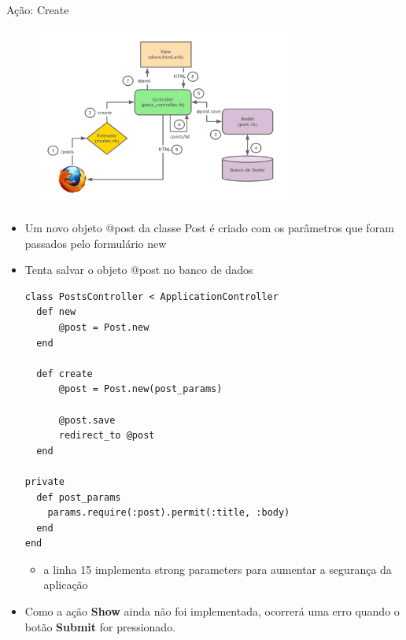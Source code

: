 \begin{frame}{Ação: Create}
  \begin{figure}[h!]
		\centering
		\includegraphics[width=0.75\textwidth]{imagens/mvc-action-create.jpg}
	\end{figure}
	\framebreak
  \begin{itemize}
		\item Um novo objeto \alert{@post} da classe \alert{Post} é criado com os parâmetros que foram passados pelo 
			formulário \alert{new}
		\item Tenta \alert{salvar} o objeto \alert{@post} no \alert{banco de dados}
		\begin{lstlisting}[style=RubyInputStyle, caption=controllers/posts\_controller.rb]
class PostsController < ApplicationController
  def new
      @post = Post.new
  end

  def create 
      @post = Post.new(post_params)
      
      @post.save
      redirect_to @post
  end

private 
  def post_params 
    params.require(:post).permit(:title, :body)
  end
end          
		\end{lstlisting}		
		\begin{itemize}
			\item a linha 15 implementa \alert{strong parameters} para aumentar a segurança da aplicação
    \end{itemize}
    \item Como a ação {\bf Show} ainda não foi implementada, ocorrerá uma erro quando
    o botão {\bf Submit} for pressionado.
	\end{itemize}	
\end{frame}